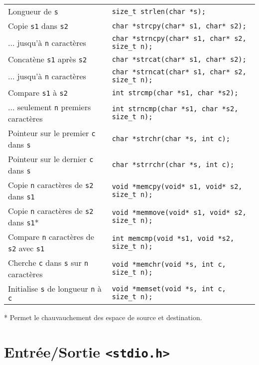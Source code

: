 \documentclass{article}
\newcommand{\cd}{\lstinline}
\begin{document}
\begin{multicols*}{3}
\begin{tabularx}{\linewidth}{Xl}
  Longueur de \texttt{s} & \cd{size_t strlen(char *s);} \\
  Copie \texttt{s1} dans \texttt{s2} & \cd{char *strcpy(char* s1, char* s2);} \\
   ... jusqu'à \texttt{n} caractères & \cd{char *strncpy(char* s1, char* s2, size_t n);} \\
  Concatène \texttt{s1} après \texttt{s2} & \cd{char *strcat(char* s1, char* s2);} \\
   ... jusqu'à \texttt{n} caractères & \cd{char *strncat(char* s1, char* s2, size_t n);} \\
  Compare \texttt{s1} à \texttt{s2} & \cd{int strcmp(char *s1, char *s2);} \\
   ... seulement \texttt{n} premiers caractères & \cd{int strncmp(char *s1, char *s2, size_t n);} \\
  Pointeur sur le premier \texttt{c} dans \texttt{s} & \cd{char *strchr(char *s, int c);} \\
  Pointeur sur le dernier \texttt{c} dans \texttt{s} & \cd{char *strrchr(char *s, int c);} \\
  \hline
  Copie \texttt{n} caractères de \texttt{s2} dans \texttt{s1} & \cd{void *memcpy(void* s1, void* s2, size_t n);} \\
  Copie \texttt{n} caractères de \texttt{s2} dans \texttt{s1}* & \cd{void *memmove(void* s1, void* s2, size_t n);} \\
  Compare \texttt{n} caractères de \texttt{s2} avec \texttt{s1} & \cd{int memcmp(void *s1, void *s2, size_t n);} \\
  Cherche \texttt{c} dans \texttt{s} sur \texttt{n} caractères & \cd{void *memchr(void *s, int c, size_t n);} \\
  Initialise \texttt{s} de longueur \texttt{n} à \texttt{c} & \cd{void *memset(void *s, int c, size_t n);} \\
\end{tabularx}

* Permet le chauvauchement des espace de source et destination.

\section*{Entrée/Sortie \texttt{<stdio.h>}}


\end{multicols*}
\end{document}
